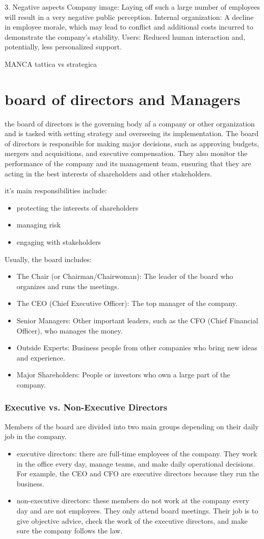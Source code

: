 \documentclass[12pt,a4paper]{report}
\begin{document}
3. Negative aspects
Company image: Laying off such a large number of employees will result in a very negative public perception.
Internal organization: A decline in employee morale, which may lead to conflict and additional costs incurred to demonstrate the company's stability.
Users: Reduced human interaction and, potentially, less personalized support.


MANCA
tattica vs strategica
\chapter{board of directors and Managers}
the board of directors is the governing body af a company or other organization and is tasked with setting strategy and overseeing its implementation. The board of directors is responsible for making major decisions, such as approving budgets, mergers and acquisitions, and executive compensation. They also monitor the performance of the company and its management team, ensuring that they are acting in the best interests of shareholders and other stakeholders.

it's main responsibilities include:
\begin{itemize}
  \item protecting the interests of shareholders
  \item managing risk
  \item engaging with stakeholders
\end{itemize}

Usually, the board includes:
\begin{itemize}
  \item The Chair (or Chairman/Chairwoman): The leader of the board who organizes and runs the meetings.
  \item The CEO (Chief Executive Officer): The top manager of the company.
  \item Senior Managers: Other important leaders, such as the CFO (Chief Financial Officer), who manages the money.
  \item Outside Experts: Business people from other companies who bring new ideas and experience.
  \item Major Shareholders: People or investors who own a large part of the company.
\end{itemize}
\subsection{Executive vs. Non-Executive Directors}
Members of the board are divided into two main groups depending on their daily job in the company.
\begin{itemize}
  \item executive directors:  there are full-time employees of the company. They work in the office every day, manage teams, and make daily operational decisions. For example, the CEO and CFO are executive directors because they run the business.
  \item non-executive directors: these members do not work at the company every day and are not employees. They only attend board meetings. Their job is to give objective advice, check the work of the executive directors, and make sure the company follows the law.
\end{itemize}
\end{document}
